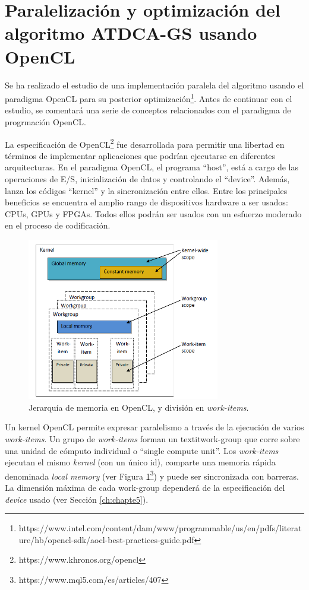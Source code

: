 \section{Paralelización y optimización del algoritmo ATDCA-GS usando OpenCL}

Se ha realizado el estudio de una implementación paralela del algoritmo usando el paradigma OpenCL para su posterior optimización\footnote{https://www.intel.com/content/dam/www/programmable/us/en/pdfs/literature/hb/opencl-sdk/aocl-best-practices-guide.pdf}. Antes de continuar con el estudio, se comentará una serie de conceptos relacionados con el paradigma de progrmación OpenCL.

La especificación de OpenCL\footnote{https://www.khronos.org/opencl} fue desarrollada para permitir una libertad en términos de implementar aplicaciones que podrían ejecutarse en diferentes arquitecturas. En el paradigma OpenCL, el programa ``host'', está a cargo de las operaciones de E/S, inicialización de datos y controlando el ``device''. Además, lanza los códigos ``kernel'' y la sincronización entre ellos. Entre los principales beneficios se encuentra el amplio rango de dispositivos hardware a ser usados: CPUs, GPUs y FPGAs. Todos ellos podrán ser usados con un esfuerzo moderado en el proceso de codificación.

\begin{figure}[htb]
\centering
\includegraphics[width=0.75\textwidth]{images/imagen_jerarquia.PNG}
\caption{Jerarquía de memoria en OpenCL, y división en \textit{work-items}.} \label{fig:imagen_jerarquia}
\end{figure}

Un kernel OpenCL permite expresar paralelismo a través de la ejecución de varios \textit{work-items}. Un grupo de \textit{work-items} forman un textit{work-group} que corre sobre una unidad de cómputo individual o ``single compute unit''. Los \textit{work-items} ejecutan el mismo \textit{kernel}  (con un único id), comparte una memoria rápida denominada \textit{local memory} (ver Figura \ref{fig:imagen_jerarquia}\footnote{https://www.mql5.com/es/articles/407}) y puede ser sincronizada con barreras. La dimensión máxima de cada {work-group} dependerá de la especificación del \textit{device} usado (ver Sección \ref{ch:chapte5}).   

